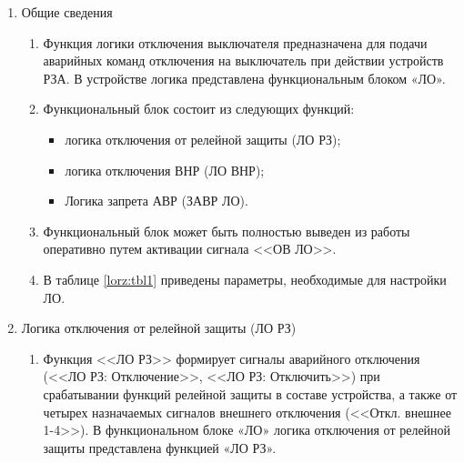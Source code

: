 
\color{black}

\begin{enumerate}

\item Общие сведения

\begin{enumerate}

\item
Функция логики отключения выключателя предназначена для подачи аварийных команд отключения на выключатель при действии устройств РЗА. В устройстве логика представлена функциональным блоком «ЛО».

\item
Функциональный блок состоит из следующих функций:
\begin{itemize}
\item логика отключения от релейной защиты (ЛО РЗ); 
\item логика отключения ВНР (ЛО ВНР);
\item Логика запрета АВР (ЗАВР ЛО).
\end{itemize}

\item
Функциональный блок может быть полностью выведен из работы оперативно путем активации сигнала <<ОВ ЛО>>.
\item
В таблице \ref{lorz:tbl1} приведены параметры, необходимые для настройки ЛО.


\end{enumerate}


\item Логика отключения от релейной защиты (ЛО РЗ)

\begin{enumerate}

\item
Функция <<ЛО РЗ>> формирует сигналы аварийного отключения (<<ЛО РЗ: Отключение>>, <<ЛО РЗ: Отключить>>) при срабатывании функций релейной защиты в составе устройства, а также от четырех назначаемых сигналов внешнего отключения (<<Откл. внешнее 1-4>>). В функциональном блоке «ЛО» логика отключения от релейной защиты представлена функцией «ЛО РЗ».


\end{enumerate}
\end{enumerate}
